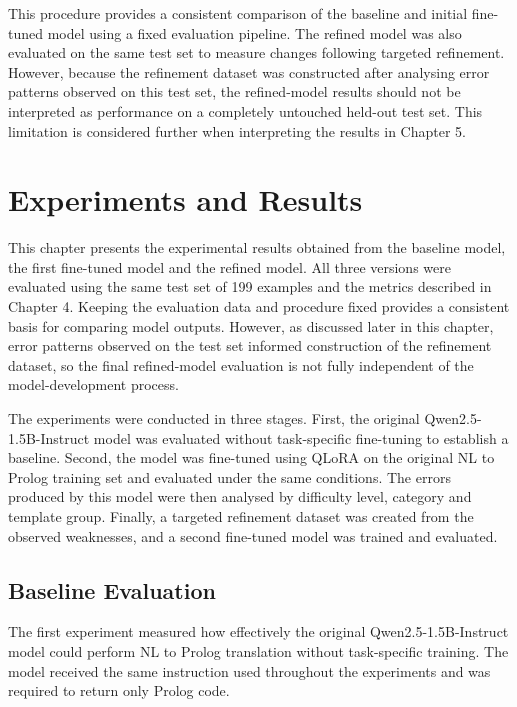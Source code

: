 \documentclass[11pt]{article} %
\theoremstyle{plain}
\theoremstyle{definition}
\begin{document}
This procedure provides a consistent comparison of the baseline and initial
fine-tuned model using a fixed evaluation pipeline. The refined model was
also evaluated on the same test set to measure changes following targeted
refinement. However, because the refinement dataset was constructed after
analysing error patterns observed on this test set, the refined-model results
should not be interpreted as performance on a completely untouched
held-out test set. This limitation is considered further when interpreting the
results in Chapter 5.

\clearpage
\section{Experiments and Results}

This chapter presents the experimental results obtained from the baseline model,
the first fine-tuned model and the refined model. All three versions were
evaluated using the same test set of 199 examples and the metrics described in
Chapter 4. Keeping the evaluation data and procedure fixed provides a consistent
basis for comparing model outputs. However, as discussed later in this chapter,
error patterns observed on the test set informed construction of the refinement
dataset, so the final refined-model evaluation is not fully independent of the
model-development process.

The experiments were conducted in three stages. First, the original
Qwen2.5-1.5B-Instruct model was evaluated without task-specific fine-tuning to
establish a baseline. Second, the model was fine-tuned using QLoRA on the
original NL to Prolog training set and evaluated under the same conditions. The
errors produced by this model were then analysed by difficulty level, category
and template group. Finally, a targeted refinement dataset was created from the
observed weaknesses, and a second fine-tuned model was trained and evaluated.

\subsection{Baseline Evaluation}

The first experiment measured how effectively the original
Qwen2.5-1.5B-Instruct model could perform NL to Prolog translation without
task-specific training. The model received the same instruction used throughout
the experiments and was required to return only Prolog code.
\end{document}
